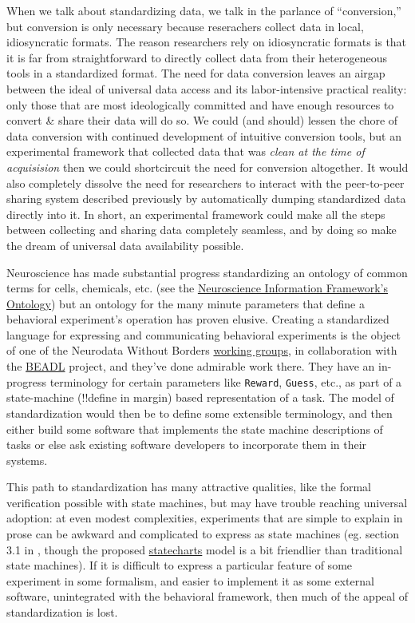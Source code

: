\documentclass[11pt]{article}
\begin{document}
\begin{multicols}{2}
When we talk about standardizing data, we talk in the parlance of
``conversion,'' but conversion is only necessary because reserachers
collect data in local, idiosyncratic formats. The reason researchers
rely on idiosyncratic formats is that it is far from straightforward to
directly collect data from their heterogeneous tools in a standardized
format. The need for data conversion leaves an airgap between the ideal
of universal data access and its labor-intensive practical reality: only
those that are most ideologically committed and have enough resources to
convert \& share their data will do so. We could (and should) lessen the
chore of data conversion with continued development of intuitive
conversion tools, but an experimental framework that collected data that
was \emph{clean at the time of acquisision} then we could shortcircuit
the need for conversion altogether. It would also completely dissolve
the need for researchers to interact with the peer-to-peer sharing
system described previously by automatically dumping standardized data
directly into it. In short, an experimental framework could make all the
steps between collecting and sharing data completely seamless, and by
doing so make the dream of universal data availability possible.

Neuroscience has made substantial progress standardizing an ontology of
common terms for cells, chemicals, etc. (see the
\href{https://github.com/SciCrunch/NIF-Ontology}{Neuroscience
Information Framework's Ontology}) but an ontology for the many minute
parameters that define a behavioral experiment's operation has proven
elusive. Creating a standardized language for expressing and
communicating behavioral experiments is the object of one of the
Neurodata Without Borders
\href{https://archive.org/details/nwb-behavioral-task-wg}{working
groups}, in collaboration with the
\href{https://archive.org/details/beadl-xml-documentation-v-0.1}{BEADL}
project, and they've done admirable work there. They have an in-progress
terminology for certain parameters like \texttt{Reward}, \texttt{Guess},
etc., as part of a state-machine (!!define in margin) based
representation of a task. The model of standardization would then be to
define some extensible terminology, and then either build some software
that implements the state machine descriptions of tasks or else ask
existing software developers to incorporate them in their systems.

This path to standardization has many attractive qualities, like the
formal verification possible with state machines, but may have trouble
reaching universal adoption: at even modest complexities, experiments
that are simple to explain in prose can be awkward and complicated to
express as state machines (eg. section 3.1 in \cite{saundersAutopilotAutomatingBehavioral2019} , though the proposed
\href{https://statecharts.github.io/}{statecharts} model is a bit
friendlier than traditional state machines). If it is difficult to
express a particular feature of some experiment in some formalism, and
easier to implement it as some external software, unintegrated with the
behavioral framework, then much of the appeal of standardization is
lost.


\end{multicols}
\end{document}
